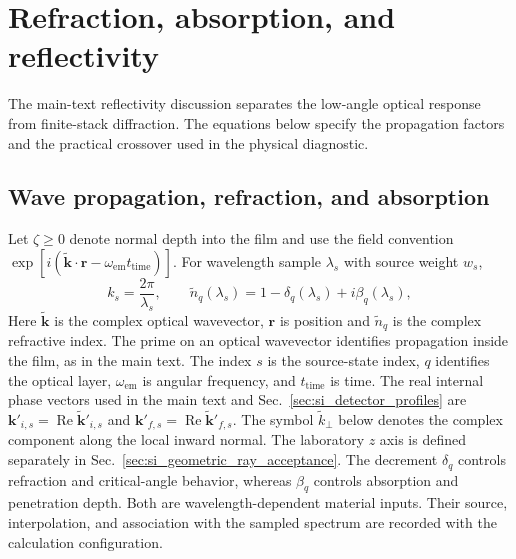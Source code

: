 \section{Refraction, absorption, and reflectivity}
\label{sec:si_optics}

The main-text reflectivity discussion separates the low-angle optical response from finite-stack diffraction. The equations below specify the propagation factors and the practical crossover used in the physical diagnostic.

\subsection{Wave propagation, refraction, and absorption}
\label{subsec:si_refraction_absorption}

Let $\zeta\geq0$ denote normal depth into the film and use the field convention
$\exp[i(\widetilde{\mathbf k}\cdot\mathbf r-\omega_{\mathrm{em}}t_{\mathrm{time}})]$. For wavelength sample
$\lambda_s$ with source weight $w_s$,
\begin{equation}
  k_s=\frac{2\pi}{\lambda_s},
  \qquad
  \tilde n_q(\lambda_s)=1-\delta_q(\lambda_s)+i\beta_q(\lambda_s),
  \label{eq:si_complex_n_lambda}
\end{equation}
Here $\widetilde{\mathbf k}$ is the complex optical wavevector, $\mathbf r$ is position and $\tilde n_q$ is the complex refractive index. The prime on an optical wavevector identifies propagation inside the film, as in the main text. The index $s$ is the source-state index, $q$ identifies the optical layer, $\omega_{\mathrm{em}}$ is angular frequency, and $t_{\mathrm{time}}$ is time. The real internal phase vectors used in the main text and Sec.~\ref{sec:si_detector_profiles} are $\mathbf k'_{i,s}=\operatorname{Re}\widetilde{\mathbf k}'_{i,s}$ and $\mathbf k'_{f,s}=\operatorname{Re}\widetilde{\mathbf k}'_{f,s}$. The symbol $\widetilde k_\perp$ below denotes the complex component along the local inward normal. The laboratory $z$ axis is defined separately in Sec.~\ref{sec:si_geometric_ray_acceptance}. The decrement $\delta_q$ controls refraction
and critical-angle behavior, whereas $\beta_q$ controls absorption and
penetration depth. Both are wavelength-dependent material inputs. Their
source, interpolation, and association with the sampled spectrum are recorded
with the calculation configuration.

